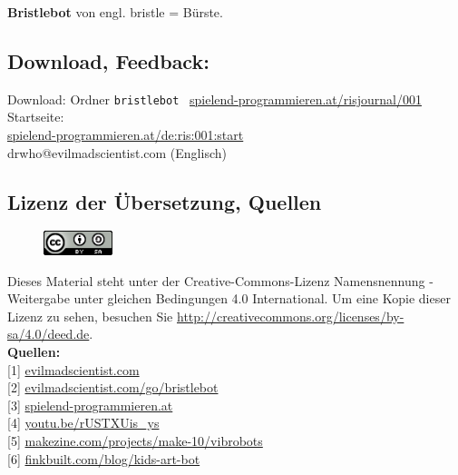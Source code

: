 \textbf{Bristlebot} von engl. bristle = Bürste. \\


\subsection*{Download, Feedback:}
\footnotesize{
Download: Ordner \texttt{bristlebot} \Mundus\ \href{http://spielend-programmieren.at/risjournal/001}{spielend-programmieren.at/risjournal/001}\\
Startseite:\\
\href{http://spielend-programmieren.at/de:ris:001:start}{spielend-programmieren.at/de:ris:001:start}\\ 
\Letter\:  drwho@evilmadscientist.com (Englisch) \\}
\normalsize
 

\subsection*{Lizenz der Übersetzung, Quellen}
\begin{figure}
\includegraphics[width=2cm]{ccbysa88x31.png}
\end{figure}
Dieses Material steht unter der Creative-Commons-Lizenz Namensnennung - Weitergabe unter gleichen Bedingungen 4.0 International. Um eine Kopie dieser Lizenz zu sehen, besuchen Sie \url{http://creativecommons.org/licenses/by-sa/4.0/deed.de}. \\

\textbf{Quellen:}\\
{[}1{]} \href{http://www.evilmadscientist.com/about/}{evilmadscientist.com} \\
{[}2{]} \href{http://www.evilmadscientist.com/go/bristlebot}{evilmadscientist.com/go/bristlebot} \\
{[}3{]} \href{http://spielend-programmieren.at}{spielend-programmieren.at} \\
{[}4{]} \href{http://youtu.be/rUSTXUis_ys}{youtu.be/rUSTXUis\_ys} \\
{[}5{]} \href{http://makezine.com/projects/make-10/vibrobots/}{makezine.com/projects/make-10/vibrobots} \\
{[}6{]} \href{http://www.finkbuilt.com/blog/kids-art-bot/}{finkbuilt.com/blog/kids-art-bot} 

